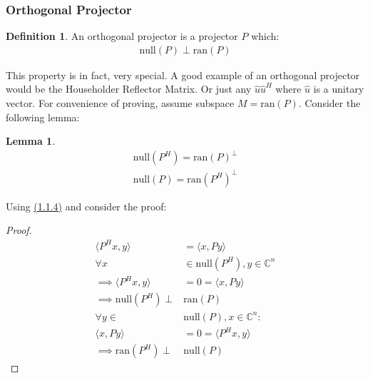 \documentclass[]{article}
\theoremstyle{definition}
\newtheorem{lemma}{Lemma}[subsection]  %
\newtheorem{definition}{Definition}
\begin{document}
        \subsubsection{Orthogonal Projector}
            \begin{definition}
                An orthogonal projector is a projector $P$ which: 
                \begin{align}
                    \text{null}(P) \perp \text{ran}(P)
                \end{align}    
            \end{definition}
            This property is in fact, very special. A good example of an orthogonal projector would be the Householder Reflector Matrix. Or just any $\hat{u}\hat{u}^H$ where $\hat{u}$ is a unitary vector. For convenience of proving, assume subspace $M = \text{ran}(P)$. Consider the following lemma: 
            \begin{lemma}
                \begin{align}
                    \text{null}(P^H) = \text{ran}(P)^{\perp}
                    \\
                    \text{null}(P) = \text{ran}(P^H)^{\perp}
                \end{align}
            \end{lemma}
            \noindent
            Using \hyperref[a:1.1.4]{(1.1.4)} and consider the proof: 
            \begin{proof}
                \begin{align}
                    \langle P^Hx, y\rangle &= \langle x, Py\rangle 
                    \\
                    \forall  x &\in \text{null}(P^H), y\in \mathbb{C}^n
                    \\
                    \implies \langle P^Hx ,y\rangle &= 0 = \langle x, Py\rangle
                    \\
                    \implies \text{null}(P^H) \perp& \text{ran}(P)
                    \\
                    \forall y \in& \text{null}(P), x \in \mathbb{C}^n: 
                    \\
                    \langle x, Py\rangle &= 0 = \langle P^Hx, y\rangle
                    \\
                    \implies \text{ran}(P^H) \perp& \text{null}(P)
                \end{align}
            \end{proof}
            
\end{document}
